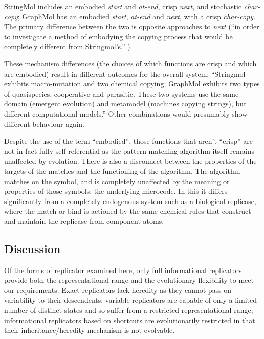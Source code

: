 StringMol includes an embodied \emph{start} and \emph{at-end}, crisp \emph{next}, and stochastic \emph{char-copy}; GraphMol has an embodied \emph{start}, \emph{at-end} and \emph{next}, with a crisp \emph{char-copy}. The primary difference between the two is opposite approaches to \emph{next} (``in order to investigate a method of embodying the copying process that would be completely different from Stringmol's.'' \parencite[p.145]{Nellis2012})

These mechanism differences (the choices of which functions are crisp and which are embodied) result in different outcomes for the overall system: ``Stringmol exhibits macro-mutation and two chemical copying; GraphMol exhibits two types of quasispecies, cooperative and parasitic. These two systems use the same domain (emergent evolution) and metamodel (machines copying strings), but different computational models.'' Other combinations would presumably show different behaviour again.

Despite the use of the term ``embodied'', those functions that aren't ``crisp'' are not in fact fully self-referential as the pattern-matching algorithm itself remains unaffected by evolution. There is also a disconnect between the properties of the targets of the matches and the functioning of the algorithm. The algorithm matches on the symbol, and is completely unaffected by the meaning or properties of those symbols, the underlying microcode. In this it differs significantly from a completely endogenous system such as a biological replicase, where the match or bind is actioned by the same chemical rules that construct and maintain the replicase from component atoms.


\subsection{Discussion}

Of the forms of replicator examined here, only full informational replicators provide both the representational range and the evolutionary flexibility to meet our requirements. Exact replicators lack heredity as they cannot pass on variability to their descendents; variable replicators are capable of only a limited number of distinct states and so suffer from a restricted representational range; informational replicators based on shortcuts are evolutionarily restricted in that their inheritance/heredity mechanism is not evolvable. 

